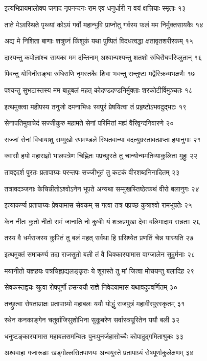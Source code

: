 इत्यभिप्रायमालोक्य जगाद नृपनन्दनः
राम एव धनुर्धारी न वयं क्षत्त्रियाः स्मृताः १३

ताते मेऽवस्थिते पृथ्व्यां कोऽयं गर्वो महान्भुवि
प्राप्नोतु गर्वस्य फलं मम निर्मुक्तसायकैः १४

अद्य मे निशिता बाणाः शत्रुघ्नं किंशुकं यथा
पुष्पितं विदधत्वद्धा क्षतावृतशरीरकम् १५

दारयन्तु कपोलांश्च सायका मम दन्तिनाम्
अश्वान्पश्यन्तु शतशो रुधिरौघपरिप्लुतान् १६

पिबन्तु योगिनीसङ्घा रुधिराणि नृमस्तकैः
शिवा भवन्तु सन्तुष्टा मद्वैरिक्रव्यभक्षणैः १७

पश्यन्तु सुभटास्तस्य मम बाहुबलं महत्
कोदण्डदण्डनिर्मुक्ताः शरकोटीर्विमुञ्चतः १८

इत्थमुक्त्वा महीपस्य तनुजो दमनाभिधः
स्वपुरं प्रेषयित्वा तं प्रहृष्टोऽभवदुद्भटः १९

सेनापतिमुवाचेदं सज्जीकुरु महामते
सेनां परिमितां मह्यं वैरिवृन्दनिवारणे २०

सज्जां सेनां विधायाशु सम्मुखो रणमण्डले
स्थितवान्या वदत्युग्रस्तावत्प्राप्ता हयानुगाः २१

क्वासौ हयो महाराज्ञो भालपत्रेण चिह्नितः
पप्रच्छुस्ते तु चान्योन्यमतिव्याकुलिता मुहुः २२

तावद्ददर्श पुरतः प्रतापाग्र्यः परन्तपः
सज्जीभूतं तु कटकं वीरशब्दनिनादितम् २३

तत्रावदञ्जनाः केचिन्नीतोऽश्वोऽनेन भूपते
अन्यथा सम्मुखस्तिष्ठेत्कथं वीरो बलानुगः २४

इत्याकर्ण्य प्रतापाग्र्यः प्रेषयामास सेवकम्
स गत्वा तत्र पप्रच्छ कुत्राश्वो रामभूपतेः २५

केन नीतः कुतो नीतो रामं जानाति नो कुधीः
यं शक्रप्रमुखा देवा बलिमादाय सन्नताः २६

तस्य वै धर्मराजस्य कुपितं तु बलं महत्
सर्वथा हि ग्रसिष्येत प्रणतिं चेन्न यास्यति २७

इत्थमुक्तं समाकर्ण्य तदा राजसुतो बली
तं वै धिक्कारयामास वाग्जालेन सुदुर्मनाः २८

मयानीतो यज्ञहयः पत्रचिह्नाद्यलङ्कृतः
ये शूरास्ते तु मां जित्वा मोचयन्तु बलादिह २९

सेवकस्तद्वचः श्रुत्वा रोषपूर्णो हसन्ययौ
राज्ञे निवेदयामास यथावदुपवर्णितम् ३०

तच्छ्रुत्वा रोषताम्राक्षः प्रतापाग्र्यो महाबलः
ययौ योद्धुं राजपुत्रं महावीरपुरस्कृतम् ३१

रथेन कनकाङ्गेन चतुर्वाजिसुशोभिना
सुकूबरेण सर्वास्त्रपूरितेन ययौ बली ३२

धनुष्टङ्कारयामास महाबलसमन्वितः
पुनःपुनर्जहासोच्चैः कोपादुद्गमिताश्रुकः ३३

अश्ववाहा गजारूढाः खड्गोल्लसितपाणयः
अन्वयुस्ते प्रतापाग्र्यं रोषपूर्णाकुलेक्षणम् ३४

